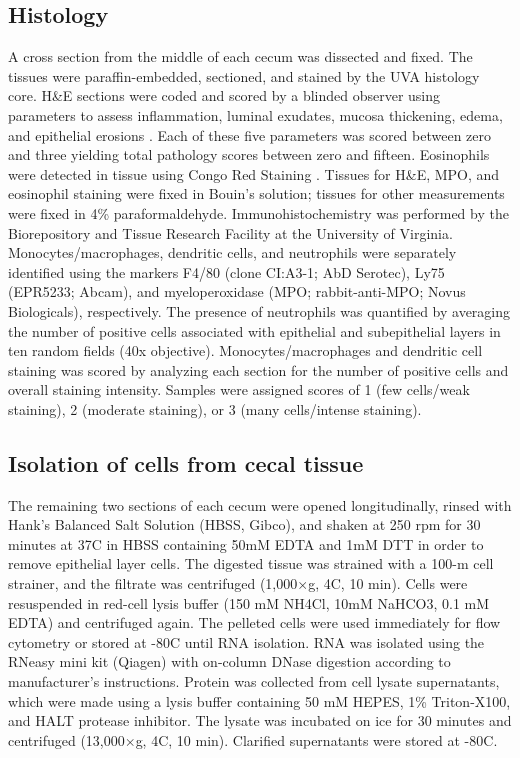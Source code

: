 \subsection{ Histology }
A cross section from the middle of each cecum was dissected and fixed. The tissues were paraffin-embedded, sectioned, and stained by the UVA histology core. H\&{}E sections were coded and scored by a blinded observer using parameters to assess inflammation, luminal exudates, mucosa thickening, edema, and epithelial erosions \cite{Pawlowski:2010il}. Each of these five parameters was scored between zero and three yielding total pathology scores between zero and fifteen. Eosinophils were detected in tissue using Congo Red Staining \cite{Albert:2011jy}. Tissues for H\&{}E, MPO, and eosinophil staining were fixed in Bouin’s solution; tissues for other measurements were fixed in 4\% paraformaldehyde. Immunohistochemistry was performed by the Biorepository and Tissue Research Facility at the University of Virginia. Monocytes/macrophages, dendritic cells, and neutrophils were separately identified using the markers F4/80 (clone CI:A3-1; AbD Serotec), Ly75 (EPR5233; Abcam), and myeloperoxidase (MPO; rabbit-anti-MPO; Novus Biologicals), respectively. The presence of neutrophils was quantified by averaging the number of positive cells associated with epithelial and subepithelial layers in ten random fields (40x objective). Monocytes/macrophages and dendritic cell staining was scored by analyzing each section for the number of positive cells and overall staining intensity.  Samples were assigned scores of 1 (few cells/weak staining), 2 (moderate staining), or 3 (many cells/intense staining). 

\subsection{ Isolation of cells from cecal tissue }
The remaining two sections of each cecum were opened longitudinally, rinsed with Hank’s Balanced Salt Solution (HBSS, Gibco), and shaken at 250 rpm for 30 minutes at 37\textdegree{}C in HBSS containing 50mM EDTA and 1mM DTT in order to remove epithelial layer cells. The digested tissue was strained with  a 100-\textmu{}m cell strainer, and the filtrate was centrifuged (1,000$\times$g, 4\textdegree{}C, 10 min). Cells were resuspended in red-cell lysis buffer (150 mM NH4Cl, 10mM NaHCO3, 0.1 mM EDTA) and centrifuged again. The pelleted cells were used immediately for flow cytometry or stored at -80\textdegree{}C until RNA isolation. RNA was isolated using the RNeasy mini kit (Qiagen) with on-column DNase digestion according to manufacturer’s instructions. Protein was collected from cell lysate supernatants, which were made using a lysis buffer containing 50 mM HEPES, 1\% Triton-X100, and HALT protease inhibitor. The lysate was incubated on ice for 30 minutes and centrifuged (13,000$\times$g, 4\textdegree{}C, 10 min). Clarified supernatants were stored at -80\textdegree{}C.

